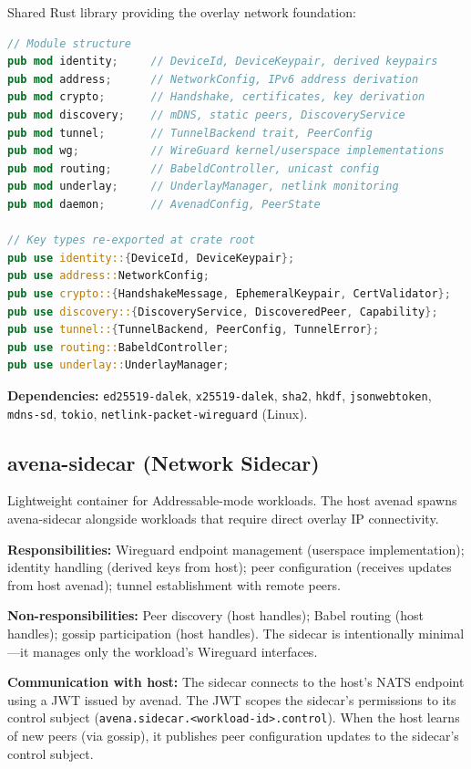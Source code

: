 Shared Rust library providing the overlay network foundation:

\begin{lstlisting}[language=Rust]
// Module structure
pub mod identity;     // DeviceId, DeviceKeypair, derived keypairs
pub mod address;      // NetworkConfig, IPv6 address derivation
pub mod crypto;       // Handshake, certificates, key derivation
pub mod discovery;    // mDNS, static peers, DiscoveryService
pub mod tunnel;       // TunnelBackend trait, PeerConfig
pub mod wg;           // WireGuard kernel/userspace implementations
pub mod routing;      // BabeldController, unicast config
pub mod underlay;     // UnderlayManager, netlink monitoring
pub mod daemon;       // AvenadConfig, PeerState

// Key types re-exported at crate root
pub use identity::{DeviceId, DeviceKeypair};
pub use address::NetworkConfig;
pub use crypto::{HandshakeMessage, EphemeralKeypair, CertValidator};
pub use discovery::{DiscoveryService, DiscoveredPeer, Capability};
pub use tunnel::{TunnelBackend, PeerConfig, TunnelError};
pub use routing::BabeldController;
pub use underlay::UnderlayManager;
\end{lstlisting}

\textbf{Dependencies:} \texttt{ed25519-dalek}, \texttt{x25519-dalek}, \texttt{sha2}, \texttt{hkdf}, \texttt{jsonwebtoken}, \texttt{mdns-sd}, \texttt{tokio}, \texttt{netlink-packet-wireguard} (Linux).

\subsection{avena-sidecar (Network Sidecar)}

Lightweight container for Addressable-mode workloads. The host avenad spawns avena-sidecar alongside workloads that require direct overlay IP connectivity.

\textbf{Responsibilities:} Wireguard endpoint management (userspace implementation); identity handling (derived keys from host); peer configuration (receives updates from host avenad); tunnel establishment with remote peers.

\textbf{Non-responsibilities:} Peer discovery (host handles); Babel routing (host handles); gossip participation (host handles). The sidecar is intentionally minimal---it manages only the workload's Wireguard interfaces.

\textbf{Communication with host:} The sidecar connects to the host's NATS endpoint using a JWT issued by avenad. The JWT scopes the sidecar's permissions to its control subject (\texttt{avena.sidecar.<workload-id>.control}). When the host learns of new peers (via gossip), it publishes peer configuration updates to the sidecar's control subject.

